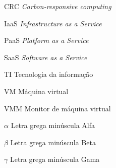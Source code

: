 \documentclass[
	12pt,				%
	oneside,			%
	a4paper,			%
	english,			%
	brazil				%
	]{abntex2ppgsi}
\begin{document}
\frenchspacing 


%
% 
%
\imprimircapa

\imprimirfolhaderosto*

\listoffigures*
\cleardoublepage

%
%
\begin{siglas}
  \item[CRC] \textit{Carbon-responsive computing}
  \item[IaaS] \textit{Infrastructure as a Service}
  \item[PaaS] \textit{Platform as a Service}
  \item[SaaS] \textit{Software as a Service}
  \item[TI] Tecnologia da informação
  \item[VM] Máquina virtual
  \item[VMM] Monitor de máquina virtual
\end{siglas}


%
% 
\begin{simbolos}
	\item[$ \alpha $] Letra grega minúscula Alfa
	\item[$ \beta $] Letra grega minúscula Beta
	\item[$ \gamma $] Letra grega minúscula Gama
  \end{simbolos}
\end{document}
